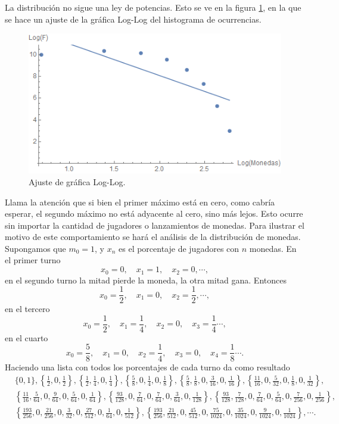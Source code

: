 \documentclass[letterpaper,11pt]{article}
\begin{document}
La distribución no sigue una ley de potencias. Esto se ve en la figura \ref{fig:LogLog}, en la que se hace un ajuste de la gráfica Log-Log del histograma de ocurrencias.
\begin{figure}[h!]
\centering
\includegraphics[scale=0.55]{img/Fig3}
\caption{Ajuste de gráfica Log-Log.}
\label{fig:LogLog}
\end{figure}
Llama la atención que si bien el primer máximo está en cero, como cabría esperar, el segundo máximo no está adyacente al cero, sino más lejos. Esto ocurre sin importar la cantidad de jugadores o lanzamientos de monedas. Para ilustrar el motivo de este comportamiento se hará el análisis de la distribución de monedas. Supongamos que $m_0 = 1$, y $x_n$ es el porcentaje de jugadores con $n$ monedas. En el primer turno
\[
	x_0 = 0, \quad x_1 = 1, \quad x_2 = 0, \cdots,
\]
en el segundo turno la mitad pierde la moneda, la otra mitad gana. Entonces
\[
	x_0 = \frac{1}{2}, \quad x_1 = 0, \quad x_2 = \frac{1}{2}, \cdots,
\]
en el tercero
\[
	x_0 = \frac{1}{2}, \quad x_1 = \frac{1}{4}, \quad x_2 = 0, \quad x_3 = \frac{1}{4} \cdots,
\]
en el cuarto
\[
	x_0 = \frac{5}{8}, \quad x_1 = 0, \quad x_2 = \frac{1}{4}, \quad x_3 = 0, \quad x_4 = \frac{1}{8} \cdots.
\]
Haciendo una lista con todos los porcentajes de cada turno da como resultado
\begin{align*}
&\{0,1\},\left\{\frac{1}{2},0,\frac{1}{2}\right\},\left\{\frac{1}{2},\frac{1}{4},0,\frac{1}{4}\right\},\left\{\frac{5}{8},0,\frac{1}{4},0,\frac{1}{8}\right\},\left\{\frac{5}{8},\frac{1}{8},0,\frac{3}{16},0,\frac{1}{16}\right\},\left\{\frac{11}{16},0,\frac{5}{32},0,\frac{1}{8},0,\frac{1}{32}\right\},\\
&\left\{\frac{11}{16},\frac{5}{64},0,\frac{9}{64},0,\frac{5}{64},0,\frac{1}{64}\right\},\left\{\frac{93}{128},0,\frac{7}{64},0,\frac{7}{64},0,\frac{3}{64},0,\frac{1}{128}\right\},\left\{\frac{93}{128},\frac{7}{128},0,\frac{7}{64},0,\frac{5}{64},0,\frac{7}{256},0,\frac{1}{256}\right\}, \\
&\left\{\frac{193}{256},0,\frac{21}{256},0,\frac{3}{32},0,\frac{27}{512},0,\frac{1}{64},0,\frac{1}{512}\right\},\left\{\frac{193}{256},\frac{21}{512},0,\frac{45}{512},0,\frac{75}{1024},0,\frac{35}{1024},0,\frac{9}{1024},0,\frac{1}{1024}\right\}, \cdots.
\end{align*}
\end{document}
